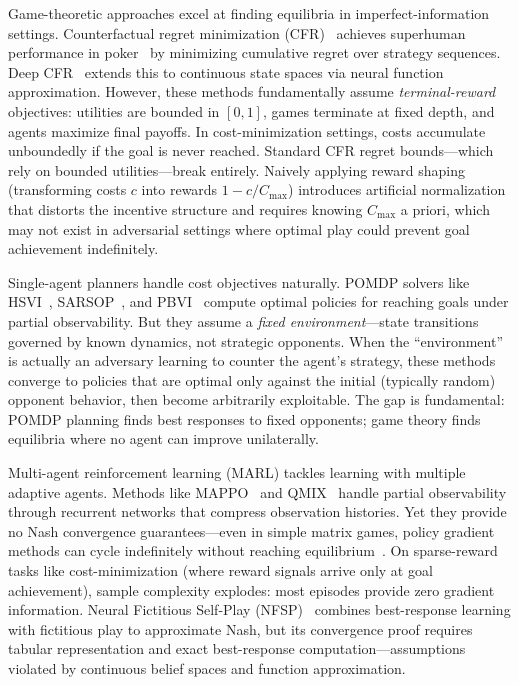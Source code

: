 \documentclass{article}
\begin{document}
Game-theoretic approaches excel at finding equilibria in imperfect-information settings. Counterfactual regret minimization (CFR)~\cite{zinkevich2007regret} achieves superhuman performance in poker~\cite{bowling2015heads,brown2017superhuman} by minimizing cumulative regret over strategy sequences. Deep CFR~\cite{brown2019deep} extends this to continuous state spaces via neural function approximation. However, these methods fundamentally assume \emph{terminal-reward} objectives: utilities are bounded in $[0,1]$, games terminate at fixed depth, and agents maximize final payoffs. In cost-minimization settings, costs accumulate unboundedly if the goal is never reached. Standard CFR regret bounds---which rely on bounded utilities---break entirely. Naively applying reward shaping (transforming costs $c$ into rewards $1-c/C_{\max}$) introduces artificial normalization that distorts the incentive structure and requires knowing $C_{\max}$ a priori, which may not exist in adversarial settings where optimal play could prevent goal achievement indefinitely.

Single-agent planners handle cost objectives naturally. POMDP solvers like HSVI~\cite{smith2005heuristic}, SARSOP~\cite{kurniawati2008sarsop}, and PBVI~\cite{pineau2003point} compute optimal policies for reaching goals under partial observability. But they assume a \emph{fixed environment}---state transitions governed by known dynamics, not strategic opponents. When the ``environment'' is actually an adversary learning to counter the agent's strategy, these methods converge to policies that are optimal only against the initial (typically random) opponent behavior, then become arbitrarily exploitable. The gap is fundamental: POMDP planning finds best responses to fixed opponents; game theory finds equilibria where no agent can improve unilaterally.

Multi-agent reinforcement learning (MARL) tackles learning with multiple adaptive agents. Methods like MAPPO~\cite{yu2022mappo} and QMIX~\cite{rashid2018qmix} handle partial observability through recurrent networks that compress observation histories. Yet they provide no Nash convergence guarantees---even in simple matrix games, policy gradient methods can cycle indefinitely without reaching equilibrium~\cite{balduzzi2018mechanics}. On sparse-reward tasks like cost-minimization (where reward signals arrive only at goal achievement), sample complexity explodes: most episodes provide zero gradient information. Neural Fictitious Self-Play (NFSP)~\cite{heinrich2016deep} combines best-response learning with fictitious play to approximate Nash, but its convergence proof requires tabular representation and exact best-response computation---assumptions violated by continuous belief spaces and function approximation.
\end{document}

